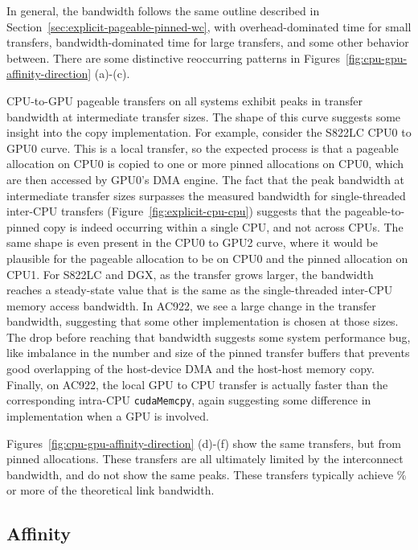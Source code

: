 In general, the bandwidth follows the same outline described in Section~\ref{sec:explicit-pageable-pinned-wc}, with overhead-dominated time for small transfers, bandwidth-dominated time for large transfers, and some other behavior between.
There are some distinctive reoccurring patterns in Figures~\ref{fig:cpu-gpu-affinity-direction} (a)-(c).

CPU-to-GPU pageable transfers on all systems exhibit peaks in transfer bandwidth at intermediate transfer sizes.
The shape of this curve suggests some insight into the copy implementation.
For example, consider the S822LC CPU0 to GPU0 curve.
This is a local transfer, so the expected process is that a pageable allocation on CPU0 is copied to one or more pinned allocations on CPU0, which are then accessed by GPU0's DMA engine.
The fact that the peak bandwidth at intermediate transfer sizes surpasses the measured bandwidth for single-threaded inter-CPU transfers (Figure~\ref{fig:explicit-cpu-cpu}) suggests that the pageable-to-pinned copy is indeed occurring within a single CPU, and not across CPUs.
The same shape is even present in the CPU0 to GPU2 curve, where it would be plausible for the pageable allocation to be on CPU0 and the pinned allocation on CPU1.
For S822LC and DGX, as the transfer grows larger, the bandwidth reaches a steady-state value that is the same as the single-threaded inter-CPU memory access bandwidth.
In AC922, we see a large change in the transfer bandwidth, suggesting that some other implementation is chosen at those sizes.
The drop before reaching that bandwidth suggests some system performance bug, like imbalance in the number and size of the pinned transfer buffers that prevents good overlapping of the host-device DMA and the host-host memory copy.
Finally, on AC922, the local GPU to CPU transfer is actually faster than the corresponding intra-CPU \texttt{cudaMemcpy}, again suggesting some difference in implementation when a GPU is involved.

Figures~\ref{fig:cpu-gpu-affinity-direction} (d)-(f) show the same transfers, but from pinned allocations.
These transfers are all ultimately limited by the interconnect bandwidth, and do not show the same peaks.
These transfers typically achieve \% or more of the theoretical link bandwidth.

\subsection{Affinity}
\label{sec:explicit-cpu-gpu-affinity}

